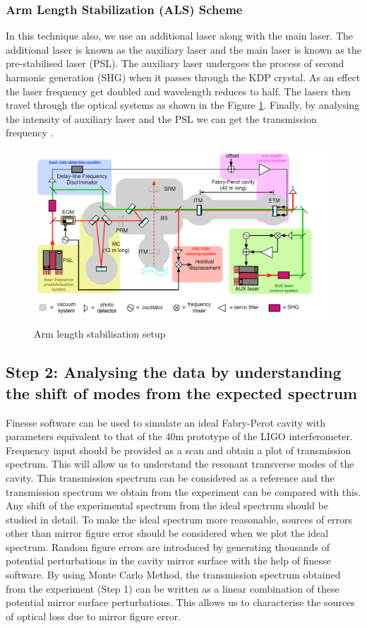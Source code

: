 \documentclass[colorlinks=true,pdfstartview=FitV,linkcolor=blue,
            citecolor=red,urlcolor=magenta]{ligodoc}
\begin{document}
\subsubsection{Arm Length Stabilization (ALS) Scheme }
In this technique also, we use an additional laser along with the main laser. The additional laser is known as the auxiliary laser and the main laser is known as the pre-stabilised laser (PSL). The auxiliary laser undergoes the process of second harmonic generation (SHG) when it passes through the KDP crystal. As an effect the laser frequency get doubled and wavelength reduces to half. The lasers then travel through the optical systems as shown in the Figure \ref{fig:als}. Finally, by analysing the intensity of auxiliary laser and the PSL we can get the transmission frequency \cite{izumi}.
 \begin{figure}[htbp]
\begin{center}
\includegraphics[width=7in]{als}
\caption{Arm length stabilisation setup}
\label{fig:als}
\end{center}
\end{figure}

\subsection{Step 2: Analysing the data by understanding the shift of  modes from the expected spectrum }
Finesse software can be used to simulate an ideal Fabry-Perot cavity with parameters equivalent to that of the 40m prototype of the LIGO interferometer. Frequency input should be provided as a scan and obtain a plot of transmission spectrum. This will allow us to understand the resonant transverse modes of the cavity. This transmission spectrum can be considered as a reference and the transmission spectrum we obtain from the experiment can be compared with this. Any shift of the experimental spectrum from the ideal spectrum should be studied in detail. To make the ideal spectrum more reasonable, sources of errors other than mirror figure error should be considered when we plot the ideal spectrum. Random figure errors are introduced by generating thousands of potential perturbations in the cavity mirror surface with the help of finesse software. By using Monte Carlo Method, the transmission spectrum obtained from the experiment (Step 1) can be written as a linear combination of these potential mirror surface perturbations. This allows us to characterise the sources of optical loss due to mirror figure error.
\end{document}

